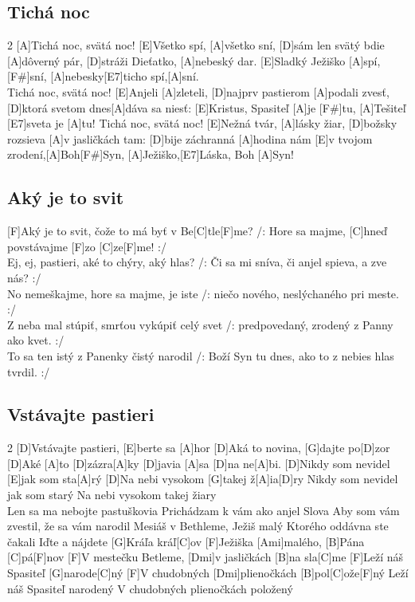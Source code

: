 \documentclass[12pt]{article}
\begin{document}
\subsection{Tichá noc}
\begin{multicols}{2}
	[A]Tichá noc, svätá noc!
	[E]Všetko spí, [A]všetko sní,
	[D]sám len svätý bdie [A]dôverný pár,
	[D]stráži Dieťatko, [A]nebeský dar.
	[E]Sladký Ježiško [A]spí,[F#]sní,
	[A]nebesky[E7]ticho spí,[A]sní.
	\\
	[A]Tichá noc, svätá noc!
	[E]Anjeli [A]zleteli,
	[D]najprv pastierom [A]podali zvesť,
	[D]ktorá svetom dnes[A]dáva sa niesť:
	[E]Kristus, Spasiteľ [A]je [F#]tu,
	[A]Tešiteľ [E7]sveta je [A]tu!
	\columnbreak
	[A]Tichá noc, svätá noc!
	[E]Nežná tvár, [A]lásky žiar,
	[D]božsky rozsieva [A]v jasličkách tam:
	[D]bije záchranná [A]hodina nám
	[E]v tvojom zrodení,[A]Boh[F#]Syn,
	[A]Ježiško,[E7]Láska, Boh [A]Syn!
	
\end{multicols}

\subsection{Aký je to svit}
	[F]Aký je to svit, čože to má byť v Be[C]tle[F]me?
	/: Hore sa majme, [C]hneď povstávajme [F]zo [C]ze[F]me! :/
	\\
	Ej, ej, pastieri, aké to chýry, aký hlas?
	/: Či sa mi sníva, či anjel spieva, a zve nás? :/
	\\
	No nemeškajme, hore sa majme, je iste
	/: niečo nového, neslýchaného pri meste. :/
	\\
	Z neba mal stúpiť, smrťou vykúpiť celý svet
	/: predpovedaný, zrodený z Panny ako kvet. :/
	\\
	To sa ten istý z Panenky čistý narodil
	/: Boží Syn tu dnes, ako to z nebies hlas tvrdil. :/

\subsection{Vstávajte pastieri}
\begin{multicols}{2}
	[D]Vstávajte pastieri, [E]berte sa [A]hor
	[D]Aká to novina, [G]dajte po[D]zor
	[D]Aké [A]to [D]zázra[A]ky [D]javia [A]sa [D]na ne[A]bi.
	[D]Nikdy som nevidel [E]jak som sta[A]rý
	[D]Na nebi vysokom [G]takej ž[A]ia[D]ry
	Nikdy som nevidel jak som starý
	Na nebi vysokom takej žiary
	\\
	Len sa ma nebojte pastuškovia
	Prichádzam k vám ako anjel Slova
	Aby som vám zvestil, že sa vám narodil
	Mesiáš v Bethleme, Ježiš malý
	Ktorého oddávna ste čakali
	\columnbreak
	[F]Iďte a nájdete [G]Kráľa kráľ[C]ov
	[F]Ježiška [Ami]malého, [B]Pána [C]pá[F]nov
	[F]V mestečku Betleme, [Dmi]v jasličkách [B]na sla[C]me
	[F]Leží náš Spasiteľ [G]narode[C]ný
	[F]V chudobných [Dmi]plienočkách [B]pol[C]ože[F]ný
	Leží náš Spasiteľ narodený
	V chudobných plienočkách položený
\end{multicols}
\end{document}
